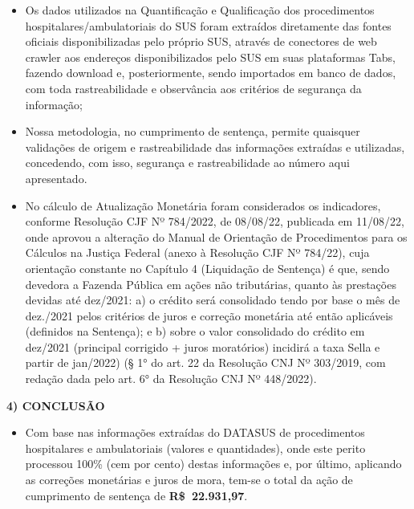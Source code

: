\documentclass{article}
\begin{document}
    \begin{itemize}
    \item Os dados utilizados na Quantificação e Qualificação dos procedimentos hospitalares/ambulatoriais do SUS foram extraídos diretamente das fontes oficiais disponibilizadas pelo próprio SUS, através de conectores de web crawler aos endereços disponibilizados pelo SUS em suas plataformas Tabs, fazendo download e, posteriormente, sendo importados em banco de dados, com toda rastreabilidade e observância aos critérios de segurança da informação;

    \item Nossa metodologia, no cumprimento de sentença, permite quaisquer validações de origem e rastreabilidade das informações extraídas e utilizadas, concedendo, com isso, segurança e rastreabilidade ao número aqui apresentado.

    \item No cálculo de Atualização Monetária foram considerados os indicadores, conforme Resolução CJF Nº 784/2022, de 08/08/22, publicada em 11/08/22, onde aprovou a alteração do Manual de Orientação de Procedimentos para os Cálculos na Justiça Federal (anexo à Resolução CJF Nº 784/22), cuja orientação constante no Capítulo 4 (Liquidação de Sentença) é que, sendo devedora a Fazenda Pública em ações não tributárias, quanto às prestações devidas até dez/2021: a) o crédito será consolidado tendo por base o mês de dez./2021 pelos critérios de juros e correção monetária até então aplicáveis (definidos na Sentença); e b) sobre o valor consolidado do crédito em dez/2021 (principal corrigido + juros moratórios) incidirá a taxa Sella e partir de jan/2022) (§ 1° do art. 22 da Resolução CNJ Nº 303/2019, com redação dada pelo art. 6° da Resolução CNJ Nº 448/2022).
    \end{itemize}

    \vspace{10mm}

    \textbf{4) CONCLUSÃO}

    \begin{itemize}
    \item Com base nas informações extraídas do DATASUS de procedimentos hospitalares e ambulatoriais (valores e quantidades), onde este perito processou 100\% (cem por cento) destas informações e, por último, aplicando as correções monetárias e juros de mora, tem-se o total da ação de cumprimento de sentença de \textbf{R\$ 22.931,97}.
    \end{itemize}
\end{document}
